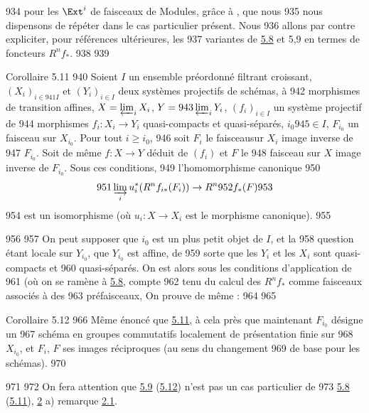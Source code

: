   934	pour les $\Ext^i$ de faisceaux de Modules, grâce à , que nous
   935	nous dispensons de répéter dans le cas particulier présent. Nous
   936	allons par contre expliciter, pour références ultérieures, les
   937	variantes de \hyperref[VII.cor5.8]{5.8} et 5,9 en termes de foncteurs $R^n f_{\ast}$.
   938	
   939	\begin{enonce*}{Corollaire 5.11}
   940	Soient $I$ un ensemble préordonné filtrant croissant, $(X_i)_{i \in
   941	I}$ et $(Y_i)_{i \in I}$ deux systèmes projectifs de schémas, à
   942	morphismes de transition affines, $X = \varprojlim_{i} X_i$, $Y =
   943	\varprojlim_{i} Y_i$, $(f_i)_{i \in I}$ un système projectif de
   944	morphismes $f_i : X_i \to Y_i$ quasi-compacts et quasi-séparés, $i_0
   945	\in I$, $F_{i_0}$ un faisceau sur $X_{i_0}$. Pour tout $i \geq i_0$,
   946	soit $F_i$ le faisceau\pageoriginale sur $X_i$ image inverse de
   947	$F_{i_0}$. Soit de même $f : X \to Y$ déduit de $(f_i)$ et $F$ le
   948	faisceau sur $X$ image inverse de $F_{i_0}$. Sous ces conditions,
   949	l'homomorphisme canonique
   950	$$
   951	\varinjlim_{i} u^{\ast}_i (R^n f_{i\ast} (F_i)) \to R^n
   952	f_{\ast} (F)
   953	$$
   954	est un isomorphisme (où $u_i : X \to X_i$ est le morphisme canonique).
   955	\end{enonce*}
   956	
   957	On peut supposer que $i_0$ est un plus petit objet de $I$, et la
   958	question étant locale sur $Y_{i_0}$, que $Y_{i_0}$ est affine, de
   959	sorte que les $Y_i$ et les $X_i$ sont quasi-compacts et
   960	quasi-séparés. On est alors sous les conditions d'application de
   961	 (où on se ramène à \hyperref[VII.cor5.8]{5.8}, compte
   962	tenu du calcul des $R^{n} f_{\ast}$ comme faisceaux associés à des
   963	préfaisceaux, On prouve de même :
   964	
   965	\begin{enonce*}{Corollaire 5.12}
   966	Même énoncé que \hyperref[VII.cor5.11]{5.11}, à cela près que maintenant $F_{i_0}$ désigne un
   967	schéma en groupes commutatifs localement de présentation finie sur
   968	$X_{i_0}$, et $F_i$, $F$ ses images réciproques (au sens du changement
   969	de base pour les schémas).
   970	\end{enonce*}
   971	
   972	On fera attention que \hyperref[VII.cor5.9]{5.9} (\resp \hyperref[VII.cor5.12]{5.12}) n'est pas un cas particulier de
   973	\hyperref[VII.cor5.8]{5.8} (\resp \hyperref[VII.cor5.11]{5.11}), \cf \hyperref[VII.sec2]{2} a) remarque \hyperref[VII.rem2.1]{2.1}.
